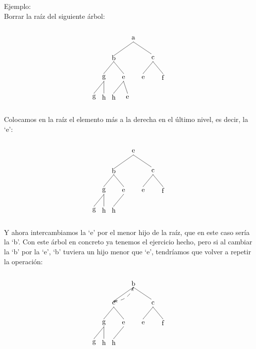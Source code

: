 \documentclass[10pt,a4paper,spanish]{report}
\begin{document}
\noindent
Ejemplo: \\
Borrar la raíz del siguiente árbol:

\[\begin{xy}
,(0,0)*+=<10mm>[]\txt<2cm>{a}
,(-10,-10)*+=<10mm>[]\txt<2cm>{b}
,(10,-10)*+=<10mm>[]\txt<2cm>{c}
,(-15,-20)*+=<10mm>[]\txt<2cm>{g}
,(-5,-20)*+=<10mm>[]\txt<2cm>{e}
,(5,-20)*+=<10mm>[]\txt<2cm>{e}
,(15,-20)*+=<10mm>[]\txt<2cm>{f}
,(-20,-30)*+=<10mm>[]\txt<2cm>{g}
,(-15,-30)*+=<10mm>[]\txt<2cm>{h}
,(-10,-30)*+=<10mm>[]\txt<2cm>{h}
,(-3,-30)*+=<10mm>[]\txt<2cm>{e}

\ar@{-} (0,-2);(-10,-9)
\ar@{-} (0,-2);(9,-8)
\ar@{-} (-10,-12);(-15,-18)
\ar@{-} (10,-12);(5,-18)
\ar@{-} (10,-12);(15,-18)
\ar@{-} (-15,-22);(-20,-28)
\ar@{-} (-15,-22);(-15,-28)
\ar@{-} (-10,-12);(-5,-18)
\ar@{-} (-5,-22);(-10,-28)
\ar@{-} (-5,-22);(-3,-28)
\end{xy}\]

\noindent
Colocamos en la raíz el elemento más a la derecha en el último nivel, es decir, la `e':

\[\begin{xy}
,(0,0)*+=<10mm>[]\txt<2cm>{e}
,(-10,-10)*+=<10mm>[]\txt<2cm>{b}
,(10,-10)*+=<10mm>[]\txt<2cm>{c}
,(-15,-20)*+=<10mm>[]\txt<2cm>{g}
,(-5,-20)*+=<10mm>[]\txt<2cm>{e}
,(5,-20)*+=<10mm>[]\txt<2cm>{e}
,(15,-20)*+=<10mm>[]\txt<2cm>{f}
,(-20,-30)*+=<10mm>[]\txt<2cm>{g}
,(-15,-30)*+=<10mm>[]\txt<2cm>{h}
,(-10,-30)*+=<10mm>[]\txt<2cm>{h}

\ar@{-} (0,-2);(-10,-9)
\ar@{-} (0,-2);(9,-8)
\ar@{-} (-10,-12);(-15,-18)
\ar@{-} (10,-12);(5,-18)
\ar@{-} (10,-12);(15,-18)
\ar@{-} (-15,-22);(-20,-28)
\ar@{-} (-15,-22);(-15,-28)
\ar@{-} (-10,-12);(-5,-18)
\ar@{-} (-5,-22);(-10,-28)
\end{xy}\]

\noindent
Y ahora intercambiamos la `e' por el menor hijo de la raíz, que en este caso sería la `b'. Con este árbol en concreto ya tenemos el ejercicio hecho, pero si al cambiar la `b' por la `e', `b' tuviera un hijo menor que `e', tendríamos que volver a repetir la operación:

\[\begin{xy}
,(0,0)*+=<10mm>[]\txt<2cm>{b}
,(-10,-10)*+=<10mm>[]\txt<2cm>{e}
,(10,-10)*+=<10mm>[]\txt<2cm>{c}
,(-15,-20)*+=<10mm>[]\txt<2cm>{g}
,(-5,-20)*+=<10mm>[]\txt<2cm>{e}
,(5,-20)*+=<10mm>[]\txt<2cm>{e}
,(15,-20)*+=<10mm>[]\txt<2cm>{f}
,(-20,-30)*+=<10mm>[]\txt<2cm>{g}
,(-15,-30)*+=<10mm>[]\txt<2cm>{h}
,(-10,-30)*+=<10mm>[]\txt<2cm>{h}

\ar@{-} (0,-2);(-10,-9)
\ar@/^/@{<-->} (0,-2);(-10,-9)
\ar@{-} (0,-2);(9,-8)
\ar@{-} (-10,-12);(-15,-18)
\ar@{-} (10,-12);(5,-18)
\ar@{-} (10,-12);(15,-18)
\ar@{-} (-15,-22);(-20,-28)
\ar@{-} (-15,-22);(-15,-28)
\ar@{-} (-10,-12);(-5,-18)
\ar@{-} (-5,-22);(-10,-28)
\end{xy}\]
\end{document}
